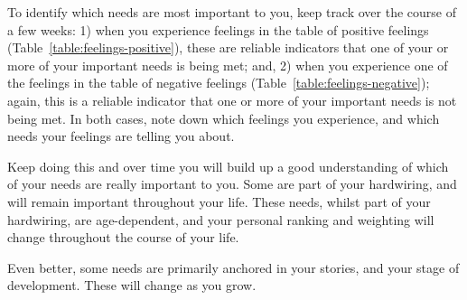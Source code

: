 To identify which needs are most important to you, keep track over the course of a few weeks: 1) when you experience feelings in the table of positive feelings (Table~\ref{table:feelings-positive}), these are reliable indicators that one of your or more of your important needs is being met; and, 2) when you experience one of the feelings in the table of negative feelings (Table~\ref{table:feelings-negative}); again, this is a reliable indicator that one or more of your important needs is not being met. In both cases, note down which feelings you experience, and which needs your feelings are telling you about.


Keep doing this and over time you will build up a good understanding of which of your needs are really important to you. Some are part of your hardwiring, and will remain important throughout your life. These needs, whilst part of your hardwiring, are age-dependent, and your personal ranking and weighting will change throughout the course of your life.


Even better, some needs are primarily anchored in your stories,  and your stage of development.  These will change as you grow.


